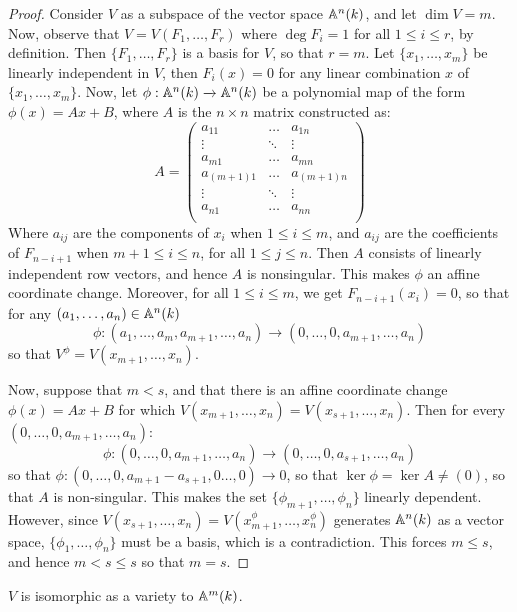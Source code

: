 \begin{proof}
  Consider $V$ as a subspace of the vector space $\mathbb{A}^n(k)$, and let $\dim{V}=m$.
  Now, observe that $V=V(F_1, \dots, F_r)$ where $\deg{F_i}=1$ for all $1 \leq i
  \leq r$, by definition. Then $\{F_1, \dots, F_r\}$ is a basis for $V$, so that
  $r=m$. Let $\{x_1, \dots, x_m\}$ be linearly independent in $V$, then
  $F_i(x)=0$ for any linear combination $x$ of $\{x_1, \dots, x_m\}$. Now, let
  $\phi:\mathbb{A}^n(k) \xrightarrow{} \mathbb{A}^n(k)$ be a polynomial map of the form
  $\phi(x)=Ax+B$, where $A$ is the  $n \times n$ matrix constructed as:
  \begin{equation*}
    A=
    \begin{pmatrix}
      a_{11}        & \dots   & a_{1n}  \\
      \vdots        & \ddots  & \vdots  \\
      a_{m1}        & \dots   & a_{mn}  \\
      a_{(m+1)1}    & \dots   & a_{(m+1)n}  \\
      \vdots        & \ddots  & \vdots  \\
      a_{n1}        & \dots   & a_{nn}  \\
    \end{pmatrix}
  \end{equation*}
  Where $a_{ij}$ are the components of $x_i$ when  $1 \leq i \leq m$, and
  $a_{ij}$ are the coefficients of $F_{n-i+1}$ when $m+1 \leq i \leq n$, for all
  $1 \leq j \leq n$. Then $A$ consists of linearly independent row vectors, and
  hence $A$ is nonsingular. This makes $\phi$ an affine coordinate change.
  Moreover, for all $1 \leq i \leq m$, we get $F_{n-i+1}(x_i)=0$, so that for
  any $(a_1, \dots, a_n) \in \mathbb{A}^n(k)$
  \begin{equation*}
    \phi:(a_1, \dots, a_m,a_{m+1}, \dots, a_n) \xrightarrow{}
    (0, \dots, 0,a_{m+1}, \dots, a_n)
  \end{equation*}
  so that $V^\phi=V(x_{m+1}, \dots, x_n)$.

  Now, suppose that $m<s$, and that there is an affine coordinate change
  $\phi(x)=Ax+B$ for which $V(x_{m+1}, \dots, x_n)=V(x_{s+1}, \dots, x_n)$. Then
  for every $(0, \dots, 0,a_{m+1}, \dots, a_n)$:
  \begin{equation*}
    \phi:(0, \dots, 0,a_{m+1}, \dots, a_n) \xrightarrow{}
    (0, \dots, 0,a_{s+1}, \dots, a_n)
  \end{equation*}
  so that $\phi:(0, \dots, 0, a_{m+1}-a_{s+1}, 0 \dots, 0) \xrightarrow{} 0$, so
  that $\ker{\phi}=\ker{A} \neq (0)$, so that $A$ is non-singular. This makes
  the set $\{\phi_{m+1}, \dots, \phi_n\}$ linearly dependent. However, since
  $V(x_{s+1}, \dots, x_n)=V(x_{m+1}^\phi, \dots, x_n^\phi)$ generates $\mathbb{A}^n(k)$
  as a vector space, $\{\phi_1, \dots, \phi_n\}$ must be a basis, which is a
  contradiction. This forces $m \leq s$, and hence $m<s \leq s$ so that $m=s$.
\end{proof}
\begin{corollary}
  $V$ is isomorphic as a variety to  $\mathbb{A}^m(k)$.
\end{corollary}

